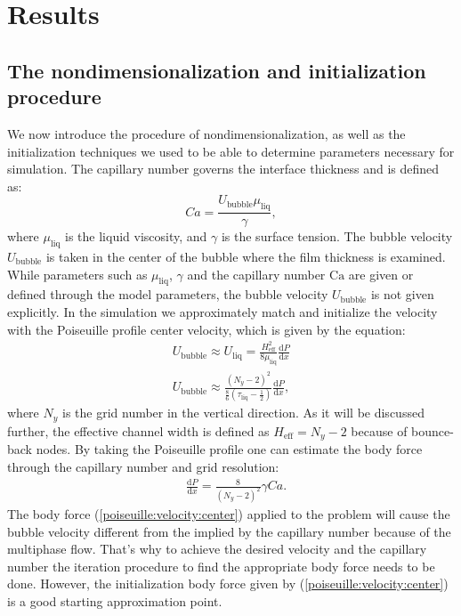 \documentclass{article}
\newcommand{\Ca}{\mathrm{Ca}}
\begin{document}
\section{Results}
\subsection{The nondimensionalization and initialization procedure}
We now introduce the procedure of nondimensionalization, as well as
the initialization techniques we used to be able to determine parameters necessary for
simulation. The capillary number governs the interface thickness and is defined as:
\begin{equation}
Ca=\frac{U_{\mathrm{bubble}} \mu_{\mathrm{liq}}}{\gamma},
\end{equation}
where $\mu_{\mathrm{liq}}$ is the liquid viscosity, and $\gamma$ is the surface tension. The
bubble velocity $U_{\mathrm{bubble}}$ is taken in the center of the bubble where the film
thickness is examined.
While parameters such as $\mu_{\mathrm{liq}}$, $\gamma$ and the capillary number $\Ca$ are given
or defined through the model parameters, the bubble velocity $U_{\mathrm{bubble}}$ is not given
explicitly.
In the simulation we approximately match and initialize the velocity with the
Poiseuille profile center velocity, which is given by the equation:
\begin{equation}
\begin{aligned}
U_{\mathrm{bubble}} \approx U_{\mathrm{liq}}=\frac{H_{\mathrm{eff}}^2}{8
\mu_{\mathrm{liq}}}\frac{\mathrm{d}P}{\mathrm{d}x}\\
U_{\mathrm{bubble}}\approx
\frac{{(N_y-2)}^2}{\frac{8}{6}(\tau_{\mathrm{liq}}-\frac{1}{2})}\frac{\mathrm{d}P}{\mathrm{d}
x } ,
\end{aligned}
\end{equation}
where $N_y$ is the grid number in the vertical direction. As it will be discussed further, the
effective channel width is defined as $H_{\mathrm{eff}}=N_y-2$ because of bounce-back nodes.
By taking the Poiseuille profile one can estimate the body force through the
capillary number and grid resolution:
\begin{equation}
\label{poiseuille:velocity:center}
\begin{aligned}
&\frac{\mathrm{d}P}{\mathrm{d}x}=\frac{8}{{(N_y-2)}^2}\gamma Ca.
\end{aligned}
\end{equation}
The body force (\ref{poiseuille:velocity:center}) applied to the problem will cause the bubble
velocity different from the implied by the capillary number because of the multiphase flow. That's
why to achieve the 
desired velocity and the
capillary number the iteration procedure to find the appropriate body force needs to be done.
However, the initialization body force given by (\ref{poiseuille:velocity:center}) is a good
starting approximation point. 
\end{document}

